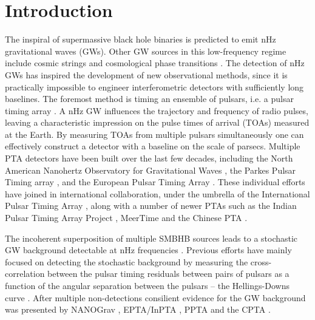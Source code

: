 \documentclass[fleqn,usenatbib,useAMS]{mnras}
\begin{document}
\section{Introduction}\label{sec:intro}
The inspiral of supermassive black hole binaries \citep[SMBHBs;][]{Rajagopal1995,Jaffe_2003, Wyithe2003,Sesana2013,McWilliams_2014,Ravi2015MNRAS.447.2772R,Burke2019, Skyes2022} is predicted to emit nHz gravitational waves (GWs). Other GW sources in this low-frequency regime include cosmic strings \citep[e.g.][]{PTAstring} and cosmological phase transitions \citep[e.g.][]{PTAphase}. The detection of nHz GWs has inspired the development of new observational methods, since it is practically impossible to engineer interferometric detectors with sufficiently long baselines. The foremost method is timing an ensemble of pulsars, i.e. a pulsar timing array \citep[PTA;][]{ Tiburzi2018, 2021hgwa.bookE...4V}. A nHz GW influences the trajectory and frequency of radio pulses, leaving a characteristic impression on the pulse times of arrival (TOAs) measured at the  Earth. By measuring TOAs from multiple pulsars simultaneously one can effectively construct a detector with a baseline on the scale of parsecs. Multiple PTA detectors have been built over the last few decades, including the North American Nanohertz Observatory for Gravitational Waves \citep[NANOGrav,][]{NANOgrav2023}, the Parkes Pulsar Timing array \citep[PPTA,][]{Parkes2023}, and the European Pulsar Timing Array \citep[EPTA,][]{EPTA2023}. These individual efforts have joined in international collaboration, under the umbrella of the International Pulsar Timing Array \citep[IPTA,][]{2019MNRAS.490.4666P}, along with a number of newer PTAs such as the Indian Pulsar Timing Array Project \citep[InPTA,][]{ipta}, MeerTime \citep{meertime2,Meertime} and the Chinese PTA \citep[CPTA,][]{Hobbs_2019}. \newline 

The incoherent superposition of multiple SMBHB sources leads to a stochastic GW background detectable at nHz frequencies \citep{Allen1997,Sesana10,Christensen2019,Renzini2022}. Previous efforts have mainly focused on detecting the stochastic background by measuring the cross-correlation between the pulsar timing residuals between pairs of pulsars as a function of the angular separation between the pulsars -- the Hellings-Downs curve \citep{Hellings}. After multiple non-detections \citep{Lentati2015,NanoGrav2018,2022MNRAS.510.4873A} consilient evidence for the GW background was presented by NANOGrav \citep{2023ApJ...951L...8A}, EPTA/InPTA \citep{2023arXiv230616214A}, PPTA \citep{2023ApJ...951L...6R} and the CPTA \citep{2023RAA....23g5024X}. \newline 
\end{document}
